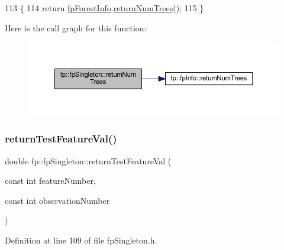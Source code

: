\begin{DoxyCode}
113                                        \{
114                 \textcolor{keywordflow}{return} \hyperlink{classfp_1_1fpSingleton_a85965009befa72a749ae498fa5b6ccfa}{fpForestInfo}.\hyperlink{classfp_1_1fpInfo_a12d3d4b2216f37daf6555f07148c4f85}{returnNumTrees}();
115             \}
\end{DoxyCode}
Here is the call graph for this function\+:\nopagebreak
\begin{figure}[H]
\begin{center}
\leavevmode
\includegraphics[width=350pt]{classfp_1_1fpSingleton_a8be36616345b6b77ce4c60b99cc2b91c_cgraph}
\end{center}
\end{figure}
\mbox{\label{classfp_1_1fpSingleton_ad74b421d65b17ba924244bff31fc9db6}} 
\subsubsection{\texorpdfstring{return\+Test\+Feature\+Val()}{returnTestFeatureVal()}}
{\footnotesize\ttfamily double fp\+::fp\+Singleton\+::return\+Test\+Feature\+Val (\begin{DoxyParamCaption}\item[{const int}]{feature\+Number,  }\item[{const int}]{observation\+Number }\end{DoxyParamCaption})\hspace{0.3cm}{\ttfamily [inline]}}



Definition at line 109 of file fp\+Singleton.\+h.


